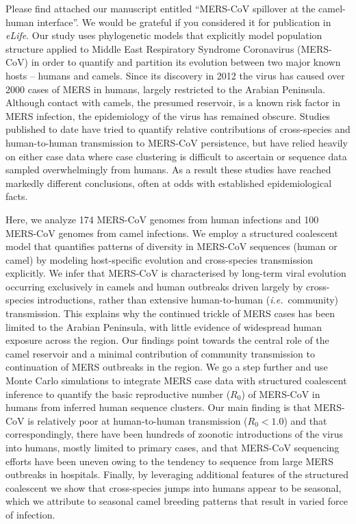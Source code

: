 \documentclass[stdletter,letterpaper,addrfromright,orderfromdateto,dateleft,11pt,noaddrto,sigleft]{newlfm}
\begin{document}
\begin{newlfm}
Please find attached our manuscript entitled ``MERS-CoV spillover at the camel-human interface''.
We would be grateful if you considered it for publication in \textit{eLife}.
Our study uses phylogenetic models that explicitly model population structure applied to Middle East Respiratory Syndrome Coronavirus (MERS-CoV) in order to quantify and partition its evolution between two major known hosts -- humans and camels. %
Since its discovery in 2012 the virus has caused over 2000 cases of MERS in humans, largely restricted to the Arabian Peninsula.
Although contact with camels, the presumed reservoir, is a known risk factor in MERS infection, the epidemiology of the virus has remained obscure.
Studies published to date have tried to quantify relative contributions of cross-species and human-to-human transmission to MERS-CoV persistence, but have relied heavily on either case data where case clustering is difficult to ascertain or sequence data sampled overwhelmingly from humans.
As a result these studies have reached markedly different conclusions, often at odds with established epidemiological facts.

Here, we analyze 174 MERS-CoV genomes from human infections and 100 MERS-CoV genomes from camel infections.
We employ a structured coalescent model that quantifies patterns of diversity in MERS-CoV sequences (human or camel) by modeling host-specific evolution and cross-species transmission explicitly.
We infer that MERS-CoV is characterised by long-term viral evolution occurring exclusively in camels and human outbreaks driven largely by cross-species introductions, rather than extensive human-to-human (\textit{i.e.}\ community) transmission.
This explains why the continued trickle of MERS cases has been limited to the Arabian Peninsula, with little evidence of widespread human exposure across the region.
Our findings point towards the central role of the camel reservoir and a minimal contribution of community transmission to continuation of MERS outbreaks in the region.
We go a step further and use Monte Carlo simulations to integrate MERS case data with structured coalescent inference to quantify the basic reproductive number ($R_{0}$) of MERS-CoV in humans from inferred human sequence clusters.
Our main finding is that MERS-CoV is relatively poor at human-to-human transmission ($R_{0}<1.0$) and that correspondingly, there have been hundreds of zoonotic introductions of the virus into humans, mostly limited to primary cases, and that MERS-CoV sequencing efforts have been uneven owing to the tendency to sequence from large MERS outbreaks in hospitals.
Finally, by leveraging additional features of the structured coalescent we show that cross-species jumps into humans appear to be seasonal, which we attribute to seasonal camel breeding patterns that result in varied force of infection.


\end{newlfm}
\end{document}
